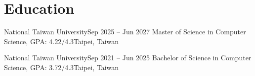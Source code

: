 \section{Education}
    \resumeSubHeadingListStart

    \resumeSubheading
    {National Taiwan University}{Sep 2025 -- Jun 2027}
    {Master of Science in Computer Science, GPA: 4.22/4.3}{Taipei, Taiwan}
	\resumeItemListStart
	\resumeItemListEnd

    \resumeSubheading
    {National Taiwan University}{Sep 2021 -- Jun 2025}
    {Bachelor of Science in Computer Science, GPA: 3.72/4.3}{Taipei, Taiwan}

    \resumeSubHeadingListEnd
